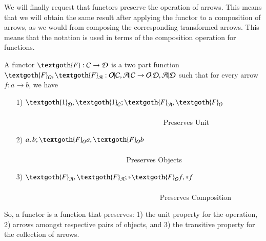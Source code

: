 \documentclass [12pt]{book}
\begin{document}
We will finally request that functors preserve the operation of arrows. This means that we will obtain the same result after applying the functor to a composition of arrows, as we would from composing the corresponding transformed arrows. This means that the notation is used in terms of the composition operation for functions.

\begin{definition}A functor $\textgoth{F}:\mathcal{C}\rightarrow\mathcal{D}$ is a two part function $\textgoth{F}_{\mathcal{O}},\textgoth{F}_{\mathcal{A}}:\mathcal{O|C},\mathcal{A|C}\rightarrow\mathcal{O|D},\mathcal{A|D}$ such that for every arrow $f:a\rightarrow b$, we have \begin{itemize}
\item[1)] $\textgoth{1}_{\mathcal{D}},\textgoth{1}_{\mathcal{C}};\textgoth{F}_{\mathcal{A}},\textgoth{F}_{\mathcal{O}}$~~~~~~~~~~~~~~~~~~~~~~~~~~~~~~~~~~~~~
~~~~~~~~~~~~~~~~~~~~~~~~~~~~~~~~~~~~~~~~~Preserves Unit
\item[2)]$a,b;\textgoth{F}_\mathcal Oa,\textgoth{F}_\mathcal Ob$~~~~~~~~~~~~~~~~~~~~~~~~~~~~~~~~~~~~~~~~~~~~~~~~~~
~~~~~~~~~~~~~~~~~~~~~~~~~
~~~~~Preserves Objects\item[3)] $\textgoth{F}_\mathcal A,\textgoth{F}_\mathcal A;*\textgoth{F}_\mathcal Of,*f$~~~~~~~~~~~~~~~~~~~~~~~~~~~~~~~~~~~~~~
~~~~~~~~~~~~~~~~~~~~~~~~~~~~~~~~~~~~~~~~Preserves Composition\end{itemize}\end{definition}

So, a functor is a function that preserves: 1) the unit property for the operation, 2) arrows amongst respective pairs of objects, and 3) the transitive property for the collection of arrows.
\end{document}

